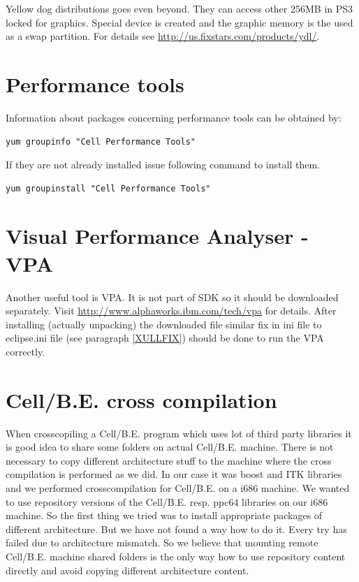 \par
Yellow dog distributions goes even beyond. They can access other 256MB in PS3 locked for graphics.
Special device is created and the graphic memory is the used as a swap partition. For details see \url{http://us.fixstars.com/products/ydl/}.

\section{Performance tools}

Information about packages concerning performance tools can be obtained by:
\begin{verbatim}
yum groupinfo "Cell Performance Tools"
\end{verbatim}
If they are not already installed issue following command to install them.
\begin{verbatim}
yum groupinstall "Cell Performance Tools"
\end{verbatim}

\section{Visual Performance Analyser - VPA}

Another useful tool is VPA. It is not part of SDK so it should be downloaded separately.
Visit \url{http://www.alphaworks.ibm.com/tech/vpa} for details.
After installing (actually unpacking) the downloaded file similar fix in ini file to eclipse.ini file (see paragraph \ref{XULLFIX}) should be done to run the VPA correctly.

\section{\mbox{Cell/B.E.} cross compilation}

When crosscopiling a \mbox{Cell/B.E.} program which uses lot of third party libraries it is good idea to share some folders on actual \mbox{Cell/B.E.} machine.
There is not necessary to copy different architecture stuff to the machine where the cross compilation is performed as we did.
In our case it was boost and ITK libraries and we performed crosscompilation for \mbox{Cell/B.E.} on a i686 machine.
We wanted to use repository versions of the \mbox{Cell/B.E.} resp. ppc64 libraries on our i686 machine.
So the first thing we tried was to install appropriate packages of different architecture.
But we have not found a way how to do it.
Every try has failed due to architecture mismatch.
So we believe that mounting remote \mbox{Cell/B.E.} machine shared folders is the only way how to use repository content directly and avoid copying different architecture content.
